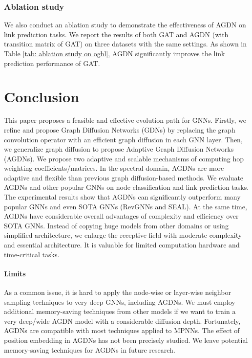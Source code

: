 \documentclass{article}
\begin{document}
\subsubsection{Ablation study}
We also conduct an ablation study to demonstrate the effectiveness of AGDN on link prediction tasks. We report the results of both GAT and AGDN (with transition matrix of GAT) on three datasets with the same settings. As shown in Table \ref{tab: ablation study on ogbl}, AGDN significantly improves the link prediction performance of GAT. 

\section{Conclusion}
This paper proposes a feasible and effective evolution path for GNNs. Firstly, we refine and propose Graph Diffusion Networks (GDNs) by replacing the graph convolution operator with an efficient graph diffusion in each GNN layer. Then, we generalize graph diffusion to propose Adaptive Graph Diffusion Networks (AGDNs). We propose two adaptive and scalable mechanisms of computing hop weighting coefficients/matrices. In the spectral domain, AGDNs are more adaptive and flexible than previous graph diffusion-based methods. We evaluate AGDNs and other popular GNNs on node classification and link prediction tasks. The experimental results show that AGDNs can significantly outperform many popular GNNs and even SOTA GNNs (RevGNNs and SEAL). At the same time, AGDNs have considerable overall advantages of complexity and efficiency over SOTA GNNs. Instead of copying huge models from other domains or using simplified architecture, we enlarge the receptive field with moderate complexity and essential architecture. It is valuable for limited computation hardware and time-critical tasks. 

\paragraph{Limits}
As a common issue, it is hard to apply the node-wise or layer-wise neighbor sampling techniques to very deep GNNs, including AGDNs. We must employ additional memory-saving techniques from other models if we want to train a very deep/wide AGDN model with a considerable diffusion depth. Fortunately, AGDNs are compatible with most techniques applied to MPNNs. The effect of position embedding in AGDNs has not been precisely studied. We leave potential memory-saving techniques for AGDNs in future research.
  
  
\end{document}
